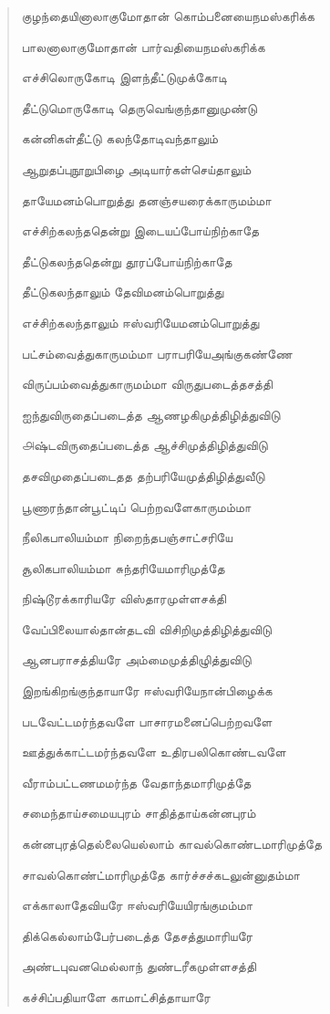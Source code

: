 \documentclass{article}
\begin{document}
\begin{quotation}
{குழந்தையினாலாகுமோதான்‌ கொம்பனையைநமஸ்கரிக்க

பாலனாலாகுமோதான்‌ பார்வதியைநமஸ்கரிக்க

எச்சிலொருகோடி இளந்தீட்டுமுக்கோடி

தீட்டுமொருகோடி தெருவெங்குந்தானுமுண்டு

கன்னிகள்தீட்டு கலந்தோடிவந்தாலும்

ஆறுதப்புநூறுபிழை அடியார்கள்செய்தாலும்

தாயேமனம்பொறுத்து தனஞ்சயரைக்காருமம்மா

எச்சிற்கலந்ததென்று இடையப்போய்நிற்காதே

தீட்டுகலந்ததென்று தூரப்போய்நிற்காதே

தீட்டுகலந்தாலும் தேவிமனம்பொறுத்து

எச்சிற்கலந்தாலும் ஈஸ்வரியேமனம்பொறுத்து

பட்சம்வைத்துகாருமம்மா பராபரியேஅங்குகண்ணே

விருப்பம்வைத்துகாருமம்மா விருதுபடைத்தசத்தி

ஐந்துவிருதைப்படைத்த ஆணழகிமுத்திழித்‌துவிடு

௮ஷ்டவிருதைப்படைத்த ஆச்சிமுத்திழித்‌துவிடு

தசவிமுதைப்படைதத தற்பரியேமுத்திழித்‌துவீடு

பூணாரந்தான்‌பூட்டிப்‌ பெற்றவளேகாருமம்மா

நீலிகபாலியம்மா நிறைந்தபஞ்சாட்சரியே

சூலிகபாலியம்மா சுந்தரியேமாரிமுத்தே

நிஷ்டூரக்காரியரே விஸ்தாரமுள்ளசக்தி

வேப்பிலையால்தான்தடவி விசிறிமுத்திழித்துவிடு

ஆனபராசத்தியரே அம்மைமுத்திழுித்துவிடு

இறங்கிறங்குந்தாயாரே ஈஸ்வரியேநான்பிழைக்க

படவேட்டமர்ந்தவளே பாசாரமனைப்பெற்றவளே

ஊத்துக்காட்டமர்ந்தவளே உதிரபலிகொண்டவளே

வீராம்பட்டணமமர்ந்த வேதாந்தமாரிமுத்தே

சமைந்தாய்சமையபுரம் சாதித்தாய்கன்னபுரம்

கன்னபுரத்தெல்லையெல்லாம் காவல்கொண்டமாரிமுத்தே

சாவல்கொண்ட்மாரிமுத்தே கார்ச்சச்கடலுன்னுதம்மா

எக்காலாதேவியரே ஈஸ்வரியேயிரங்குமம்மா

திக்கெல்லாம்பேர்படைத்த தேசத்துமாரியரே

அண்டபுவனமெல்லாந் துண்டரீகமுள்ளசத்தி

கச்சிப்பதியாளே காமாட்சித்தாயாரே

}
\end{quotation}
\end{document}
